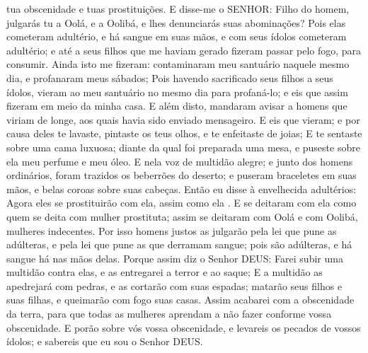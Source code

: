 {{} tua obscenidade e
{} tuas prostituições.
  E disse-me o SENHOR: Filho do homem, julgarás tu a Oolá, e a Oolibá, e lhes denunciarás suas abominações?
  Pois elas cometeram adultério, e há sangue em suas mãos, e com seus ídolos cometeram adultério; e até a seus filhos que me haviam gerado fizeram passar pelo fogo, para
{} consumir.
  Ainda isto me fizeram: contaminaram meu santuário naquele mesmo dia, e profanaram meus sábados;
  Pois havendo sacrificado seus filhos a seus ídolos, vieram ao meu santuário no mesmo dia para profaná-lo; e eis que assim fizeram em meio da minha casa.
  E além disto, mandaram avisar a homens que viriam de longe, aos quais havia sido enviado mensageiro. E eis que vieram; e por causa deles te lavaste, pintaste os teus olhos, e te enfeitaste de joias;
  E te sentaste sobre uma cama luxuosa; diante da qual foi preparada uma mesa, e puseste sobre ela meu perfume e meu óleo.
  E
{} nela voz de multidão alegre; e junto dos homens ordinários, foram trazidos os beberrões
 do deserto; e puseram braceletes em suas mãos, e belas coroas sobre suas cabeças.
  Então eu disse à envelhecida
{} adultérios: Agora eles se prostituirão com ela, assim como ela
{} .
  E se deitaram com ela como quem se deita com mulher prostituta; assim se deitaram com Oolá e com Oolibá, mulheres indecentes.
  Por isso homens justos as julgarão pela lei que pune as adúlteras, e pela lei que pune as que derramam sangue; pois são adúlteras, e há sangue há nas mãos delas.
  Porque assim diz o Senhor DEUS: Farei subir uma multidão contra elas, e as entregarei a terror e ao saque;
  E a multidão as apedrejará com pedras, e as cortarão com suas espadas; matarão seus filhos e suas filhas, e queimarão com fogo suas casas.
  Assim acabarei com a obscenidade da terra, para que todas as mulheres aprendam a não fazer conforme vossa obscenidade.
  E porão sobre vós
{} vossa obscenidade, e levareis os pecados de vossos ídolos; e sabereis que eu sou o Senhor DEUS.
\par }

